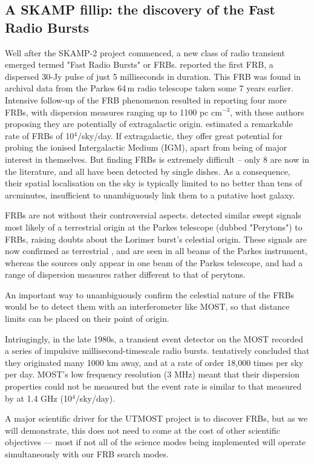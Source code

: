 \subsection{A SKAMP fillip: the discovery of the Fast Radio Bursts}

Well after the SKAMP-2 project commenced, a new class of radio transient emerged termed "Fast Radio Bursts" or FRBs. \cite{Lorimer_2007} reported the first FRB, a dispersed 30-Jy pulse of just 5 milliseconds in duration. This FRB was found in archival data from the Parkes 64\,m radio telescope taken some 7 years earlier. Intensive follow-up of the FRB phenomenon resulted in \citep{Thornton_2013} reporting four more FRBs, with dispersion measures ranging up to 1100 pc cm$^{-3}$, with these authors proposing they are potentially of extragalactic origin. \citep{Thornton_2013} estimated a remarkable rate of FRBs of 10$^4$/sky/day. If extragalactic, they offer great potential for probing the ionised Intergalactic Medium (IGM), apart from being of major interest in themselves. But finding FRBs is extremely difficult \cite{Keane_2012} -- only 8 are now in the literature, and all have been detected by single dishes. As a consequence, their spatial localisation on the sky is typically limited to no better than tens of arcminutes, insufficient to unambiguously link them to a putative host galaxy. 

FRBs are not without their controversial aspects. \cite{Burke_Spolaor_2011} detected similar swept signals most likely of a terrestrial origin at the Parkes telescope (dubbed "Perytons") to FRBs, raising doubts about the Lorimer burst's celestial origin. These signals are now confirmed as terrestrial \cite{2015arXiv150402165P}, and are seen in all beams of the Parkes instrument, whereas the \cite{Thornton_2013} sources only appear in one beam of the Parkes telescope, and had a range of dispersion measures rather different to that of perytons.

An important way to unambiguously confirm the celestial nature of the FRBs would be to detect them with an interferometer like MOST, so that distance limits can be placed on their point of origin.

Intriugingly, in the late 1980s, a transient event detector on the MOST recorded a series of impulsive millisecond-timescale radio bursts. \cite{AMY} tentatively concluded that they originated many 1000 km away, and at a rate of order 18,000 times per sky per day. MOST's low frequency resolution (3 MHz) meant that their dispersion properties could not be measured but the event rate is similar to that measured by \citep{Thornton_2013} at 1.4 GHz (10$^4$/sky/day). 

A major scientific driver for the UTMOST project is to discover FRBs, but as we will demonstrate, this does not need to come at the cost of other scientific objectives --- most if not all of the science modes being implemented will operate simultaneously with our FRB search modes.
    
    
    